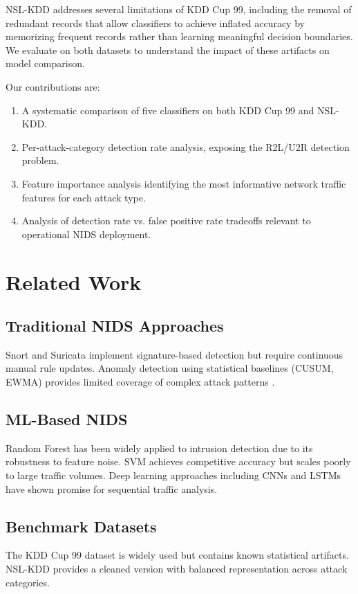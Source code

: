 \documentclass[conference]{IEEEtran}
\begin{document}
NSL-KDD \cite{tavallaee2009detailed} addresses several limitations of KDD Cup 99, including the removal of redundant records that allow classifiers to achieve inflated accuracy by memorizing frequent records rather than learning meaningful decision boundaries. We evaluate on both datasets to understand the impact of these artifacts on model comparison.

Our contributions are:
\begin{enumerate}
\item A systematic comparison of five classifiers on both KDD Cup 99 and NSL-KDD.
\item Per-attack-category detection rate analysis, exposing the R2L/U2R detection problem.
\item Feature importance analysis identifying the most informative network traffic features for each attack type.
\item Analysis of detection rate vs. false positive rate tradeoffs relevant to operational NIDS deployment.
\end{enumerate}

\section{Related Work}

\subsection{Traditional NIDS Approaches}
Snort and Suricata implement signature-based detection but require continuous manual rule updates. Anomaly detection using statistical baselines (CUSUM, EWMA) provides limited coverage of complex attack patterns \cite{mukherjee1994network}.

\subsection{ML-Based NIDS}
Random Forest has been widely applied to intrusion detection \cite{pal2005random} due to its robustness to feature noise. SVM achieves competitive accuracy but scales poorly to large traffic volumes. Deep learning approaches including CNNs \cite{lecun2015deep} and LSTMs have shown promise for sequential traffic analysis.

\subsection{Benchmark Datasets}
The KDD Cup 99 dataset \cite{kdd1999} is widely used but contains known statistical artifacts. NSL-KDD \cite{tavallaee2009detailed} provides a cleaned version with balanced representation across attack categories.
\end{document}
